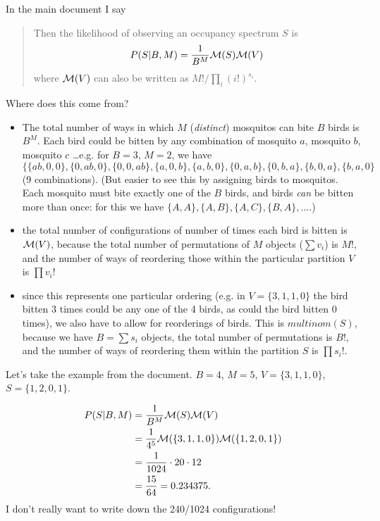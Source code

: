 \documentclass{article}
\newcommand{\multinom}{{\cal M}}
\begin{document}
In the main document I say

\begin{quote}
Then the likelihood of observing an occupancy spectrum $S$ is
\begin{equation}
P(S|B,M) =  \frac{1}{B^M} \multinom(S) \multinom(V)
\end{equation}
where $\multinom(V)$ can also be written as
$M!/\prod_i (i!)^{s_i}$.
\end{quote}

Where does this come from?

\begin{itemize}
\item The total number of ways in which $M$ (\emph{distinct})
mosquitos can bite $B$ birds is $B^M$. Each bird could be bitten
by any combination of mosquito $a$, mosquito $b$, mosquito $c$ 
\ldots e.g. for $B=3$, $M=2$, we have 
$\{\{ab,0,0\}, \{0,ab,0\}, \{0,0,ab\}, \{a,0,b\},\{a,b,0\},
\{0,a,b\},\{0,b,a\},\{b,0,a\},\{b,a,0\}$ (9 combinations).
(But easier to see this by assigning birds to mosquitos. Each
mosquito must bite exactly one of the $B$ birds, and birds \emph{can}
be bitten more than once: for this we have $\{A,A\},\{A,B\},\{A,C\},
\{B,A\}, \ldots$.)
\item the total number of configurations of number of times each
bird is bitten is $\multinom(V)$, because the total number of permutations
of $M$ objects ($\sum v_i$) is $M!$, and the number of ways of
reordering those within the particular partition $V$ is
$\prod v_i!$
\item since this represents one particular ordering (e.g. in 
$V=\{3,1,1,0\}$ the bird bitten 3 times could be any one of the
4 birds, as could the bird bitten 0 times), we also have to allow
for reorderings of birds. This is $multinom(S)$, because we have
$B=\sum s_i$ objects, the total number of permutations is $B!$,
and the number of ways of reordering them within the partition $S$
is $\prod s_i!$.
\end{itemize}

Let's take the example from the document. $B=4$, $M=5$, 
$V=\{3,1,1,0\}$, $S=\{1,2,0,1\}$.

\begin{equation*}
\begin{split}
P(S|B,M) & =  \frac{1}{B^M} \multinom(S) \multinom(V) \\
         & =  \frac{1}{4^5} \multinom(\{3,1,1,0\}) \multinom(\{1,2,0,1\}) \\
         & =  \frac{1}{1024} \cdot 20 \cdot 12 \\
         & =  \frac{15}{64} = 0.234375.
\end{split}
\end{equation*}
I don't really want to write down the 240/1024 configurations!
\end{document}
